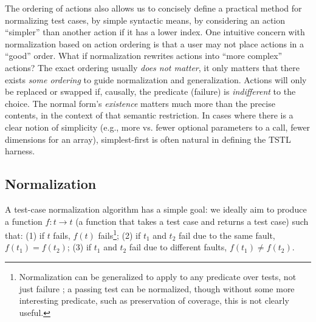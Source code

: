 The ordering of actions also allows us to concisely define a
practical method for normalizing test cases, by
simple syntactic means, by considering an action ``simpler'' than another
action if it has a lower index.  One intuitive concern with normalization
based on action ordering is that a user may not place actions
in a ``good'' order.  What if normalization
rewrites actions into ``more complex'' actions?
The exact ordering usually \emph{does not matter}, it only
matters that there exists \emph{some ordering} to guide normalization
and generalization.  Actions will only be replaced or swapped if,
causally, the predicate (failure) is \emph{indifferent} to the choice.  The
normal form's \emph{existence} matters much more than the precise contents, in
the context of that semantic restriction.  In cases where there is a
clear notion of simplicity (e.g., more vs. fewer optional parameters
to a call, fewer dimensions for an array), simplest-first is often
natural in defining the TSTL harness.

\subsection{Normalization}

A test-case normalization algorithm has a simple goal:  we ideally aim to
produce a function $f : t \rightarrow t$ (a function that takes a test
case and returns a test case) such that: (1) if $t$ fails, $f(t)$ fails\footnote{Normalization can
    be generalized to apply to any predicate over tests, not just
    failure \cite{icst2014}; a passing test can be normalized, though
    without some more interesting predicate, such as preservation of
    coverage, this is not clearly useful.}; (2) if $t_1$ and $t_2$ fail
  due to the same fault, $f(t_1) = f(t_2)$; (3) if $t_1$ and $t_2$ fail due to different faults, $f(t_1) \not=
  f(t_2)$.

\begin{comment}
\begin{enumerate}
\item If $t$ fails, $f(t)$ fails\footnote{Normalization can
    be generalized to apply to any predicate over tests, not just
    failure \cite{icst2014}.}.
\item If $t_1$ and $t_2$ fail due to the same fault, $f(t_1) = f(t_2)$.
\item If $t_1$ and $t_2$ fail due to different faults, $f(t_1) \not=
  f(t_2)$.
\end{enumerate}
\end{comment}

